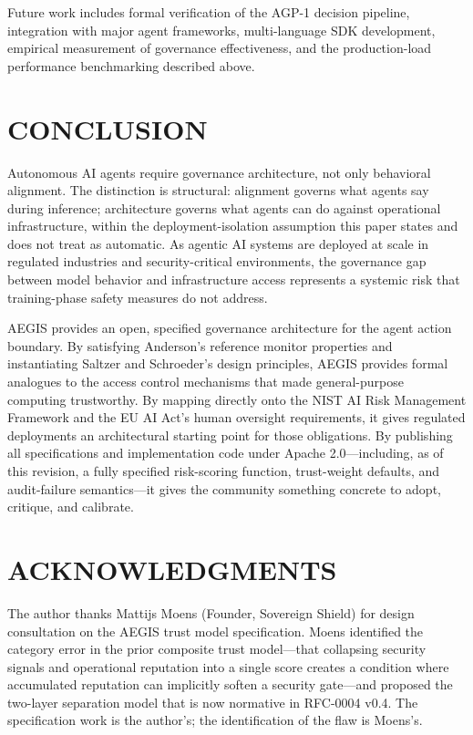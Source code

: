 \documentclass{IEEEcsmag}
\begin{document}
Future work includes formal verification of the AGP-1 decision pipeline, integration with major agent frameworks, multi-language SDK development, empirical measurement of governance effectiveness, and the production-load performance benchmarking described above.

\section{CONCLUSION}

Autonomous AI agents require governance architecture, not only behavioral alignment. The distinction is structural: alignment governs what agents say during inference; architecture governs what agents can do against operational infrastructure, within the deployment-isolation assumption this paper states and does not treat as automatic. As agentic AI systems are deployed at scale in regulated industries and security-critical environments, the governance gap between model behavior and infrastructure access represents a systemic risk that training-phase safety measures do not address.

AEGIS provides an open, specified governance architecture for the agent action boundary. By satisfying Anderson's reference monitor properties and instantiating Saltzer and Schroeder's design principles, AEGIS provides formal analogues to the access control mechanisms that made general-purpose computing trustworthy. By mapping directly onto the NIST AI Risk Management Framework and the EU AI Act's human oversight requirements, it gives regulated deployments an architectural starting point for those obligations. By publishing all specifications and implementation code under Apache 2.0---including, as of this revision, a fully specified risk-scoring function, trust-weight defaults, and audit-failure semantics---it gives the community something concrete to adopt, critique, and calibrate.

\section{ACKNOWLEDGMENTS}

The author thanks Mattijs Moens (Founder, Sovereign Shield) for design consultation on the AEGIS trust model specification. Moens identified the category error in the prior composite trust model---that collapsing security signals and operational reputation into a single score creates a condition where accumulated reputation can implicitly soften a security gate---and proposed the two-layer separation model that is now normative in RFC-0004 v0.4. The specification work is the author's; the identification of the flaw is Moens's.
\end{document}
